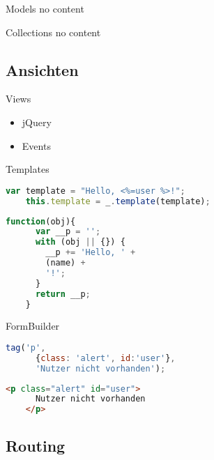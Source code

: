 \begin{frame}{Models}
  no content
\end{frame}

\begin{frame}{Collections}
  no content
\end{frame}

\subsection{Ansichten}

\begin{frame}{Views}
  \begin{itemize}
    \item jQuery
    \item Events
  \end{itemize}
\end{frame}

\begin{frame}[fragile]{Templates}
  \begin{lstlisting}[language=JavaScript,gobble=4]
    var template = "Hello, <%=user %>!";
    this.template = _.template(template);
  \end{lstlisting}
  
  \begin{lstlisting}[language=JavaScript,gobble=4]
    function(obj){
      var __p = '';
      with (obj || {}) {
        __p += 'Hello, ' +
        (name) +
        '!';
      }
      return __p;
    }
  \end{lstlisting}
\end{frame}

\begin{frame}[fragile]{FormBuilder}
  \begin{lstlisting}[language=JavaScript,gobble=4]
    tag('p',
      {class: 'alert', id:'user'},
      'Nutzer nicht vorhanden');
  \end{lstlisting}
  \begin{lstlisting}[language=HTML,gobble=4]
    <p class="alert" id="user">
      Nutzer nicht vorhanden
    </p>
  \end{lstlisting}
\end{frame}

\subsection{Routing}

